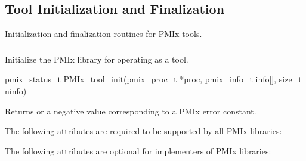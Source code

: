\subsection{Tool Initialization and Finalization}
\label{chap:tools:init}

Initialization and finalization routines for \ac{PMIx} tools.

\subsubsection{}

\summary

Initialize the \ac{PMIx} library for operating as a tool.

\format

\cspecificstart
\begin{codepar}
pmix_status_t
PMIx_tool_init(pmix_proc_t *proc,
               pmix_info_t info[], size_t ninfo)
\end{codepar}
\cspecificend

\begin{arglist}
\end{arglist}

Returns  or a negative value corresponding to a PMIx error constant.

\reqattrstart
The following attributes are required to be supported by all \ac{PMIx} libraries:


\reqattrend

\optattrstart
The following attributes are optional for implementers of \ac{PMIx} libraries:

